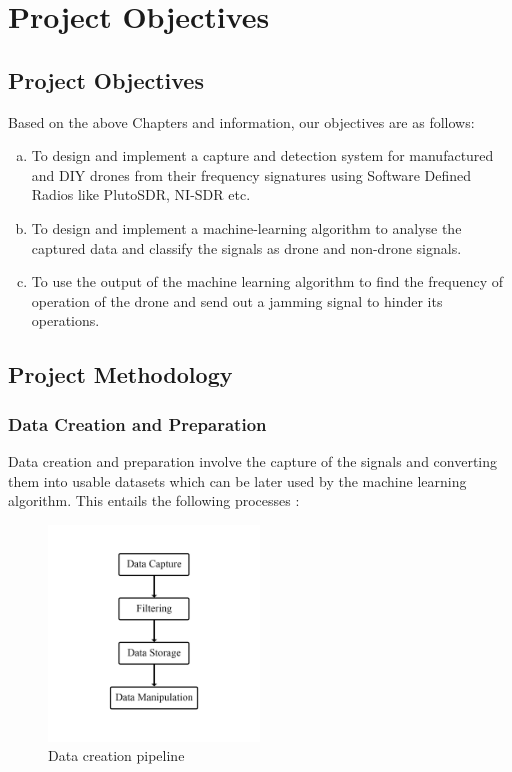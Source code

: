\chapter{Project Objectives} \label{Project Objectives}
\section{Project Objectives} \label{Project Objective}
Based on the above Chapters and information, our objectives are as follows:
\begin{enumerate}[(a)]
  \item To design and implement a capture and detection system for manufactured and DIY drones from their frequency signatures using Software Defined Radios like PlutoSDR, NI-SDR etc.
  \item To design and implement a machine-learning algorithm to analyse the captured data and classify the signals as drone and non-drone signals.
  \item To use the output of the machine learning algorithm to find the frequency of operation of the drone and send out a jamming signal to hinder its operations.
\end{enumerate}

\section{Project Methodology} \label{Project Methodology}

\subsection{Data Creation and Preparation}

Data creation and preparation involve the capture of the signals and converting them into usable datasets which can be later used by the machine learning algorithm. This entails the following processes :
\begin{figure}[H]
  \centering
  \includegraphics[width=0.5\textwidth]{dataCreationAndPreparation.png}
  \caption{Data creation pipeline}
\end{figure}



